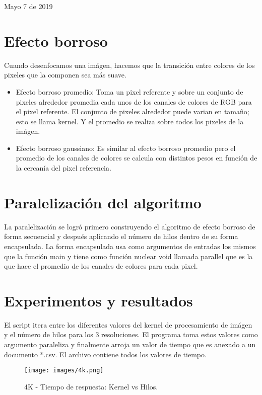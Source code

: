 \documentclass{IEEEtran}
\begin{document}
\hfill      
 
\hfill Mayo 7 de 2019

\section{Efecto borroso}
Cuando desenfocamos una imágen, hacemos que la transición entre colores de los pixeles que la componen sea más suave.

\begin{itemize}
\item Efecto borroso promedio: Toma un pixel referente y sobre un conjunto de pixeles alrededor promedia cada unos de los canales de colores de RGB para el pixel referente. El conjunto de pixeles alrededor puede varian en tamaño; esto se llama kernel. Y el promedio se realiza sobre todos los pixeles de la imágen.
\item Efecto borroso gaussiano: Es similar al efecto borroso promedio pero el promedio de los canales de colores se calcula con distintos pesos en función de la cercanía del pixel referencia.
\end{itemize}

\section{Paralelización del algoritmo}
La paralelización se logró primero construyendo el algoritmo de efecto borroso de forma secuencial y después aplicando el número de hilos dentro de su forma encapsulada. La forma encapsulada usa como argumentos de entradas los mismos que la función main y tiene como función nuclear void llamada parallel que es la que hace el promedio de los canales de colores para cada pixel.

\section{Experimentos y resultados}
El script itera entre los diferentes valores del kernel de procesamiento de imágen y el número de hilos para los 3 resoluciones. El programa toma estos valores como argumento paraleliza y finalmente arroja un valor de tiempo que es anexado a un documento *.csv. El archivo contiene todos los valores de tiempo.

\begin{figure}[htp]
\centering
\texttt{[image: images/4k.png]}
\caption{4K - Tiempo de respuesta: Kernel vs Hilos.}
\label{4kplot_time}
\end{figure}
\end{document}
